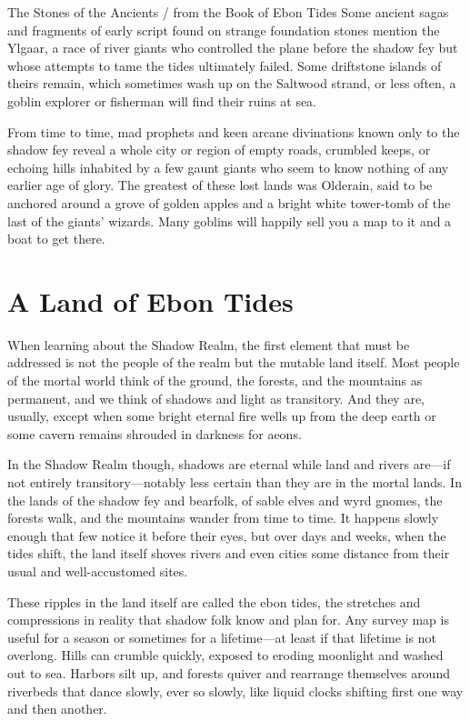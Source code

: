 \documentclass[10pt,a4paper,twoside,bg=print,twocolumn,openany,nodeprecatedcode]{dndbook}
\begin{document}
\begin{DndSidebar}[float=!b]{The Stones of the Ancients / from the Book of Ebon Tides}
Some ancient sagas and fragments of early script found on strange foundation stones mention the Ylgaar, a race of river giants who controlled the plane before the shadow fey but whose attempts to tame the tides ultimately failed. Some driftstone islands of theirs remain, which sometimes wash up on the Saltwood strand, or less often, a goblin explorer or fisherman will find their ruins at sea.



From time to time, mad prophets and keen arcane divinations known only to the shadow fey reveal a whole city or region of empty roads, crumbled keeps, or echoing hills inhabited by a few gaunt giants who seem to know nothing of any earlier age of glory. The greatest of these lost lands was Olderain, said to be anchored around a grove of golden apples and a bright white tower-tomb of the last of the giants' wizards. Many goblins will happily sell you a map to it and a boat to get there.



\end{DndSidebar}

\section{A Land of Ebon Tides}
When learning about the Shadow Realm, the first element that must be addressed is not the people of the realm but the mutable land itself. Most people of the mortal world think of the ground, the forests, and the mountains as permanent, and we think of shadows and light as transitory. And they are, usually, except when some bright eternal fire wells up from the deep earth or some cavern remains shrouded in darkness for aeons.

In the Shadow Realm though, shadows are eternal while land and rivers are—if not entirely transitory—notably less certain than they are in the mortal lands. In the lands of the shadow fey and bearfolk, of sable elves and wyrd gnomes, the forests walk, and the mountains wander from time to time. It happens slowly enough that few notice it before their eyes, but over days and weeks, when the tides shift, the land itself shoves rivers and even cities some distance from their usual and well-accustomed sites.

These ripples in the land itself are called the ebon tides, the stretches and compressions in reality that shadow folk know and plan for. Any survey map is useful for a season or sometimes for a lifetime—at least if that lifetime is not overlong. Hills can crumble quickly, exposed to eroding moonlight and washed out to sea. Harbors silt up, and forests quiver and rearrange themselves around riverbeds that dance slowly, ever so slowly, like liquid clocks shifting first one way and then another.
\end{document}
